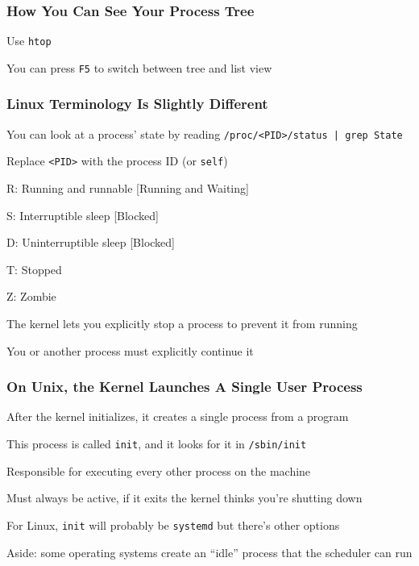   \begin{frame}
    \frametitle{How You Can See Your Process Tree}

    Use \texttt{htop}

    \vspace{2em}

    You can press \texttt{F5} to switch between tree and list view
  \end{frame}

  \begin{frame}
    \frametitle{Linux Terminology Is Slightly Different}

    You can look at a process' state by reading \texttt{/proc/<PID>/status | grep State}

    \hspace{2em} Replace \texttt{<PID>} with the process ID (or \texttt{self})

    \vspace{2em}

    R: Running and runnable [Running and Waiting]

    S: Interruptible sleep [Blocked]

    D: Uninterruptible sleep [Blocked]

    T: Stopped

    Z: Zombie

    \vspace{2em}

    The kernel lets you explicitly stop a process to prevent it from running

    \hspace{2em} You or another process must explicitly continue it
  \end{frame}

  \begin{frame}
    \frametitle{On Unix, the Kernel Launches A Single User Process}

    After the kernel initializes, it creates a single process
    from a program

    \vspace{2em}

    This process is called \texttt{init}, and it looks for it in \texttt{/sbin/init}

    \hspace{2em} Responsible for executing every other process on the machine

    \hspace{2em} Must always be active, if it exits the kernel thinks you're shutting down

    \vspace{2em}

    For Linux, \texttt{init} will probably be \texttt{systemd} but there's other options

    \vspace{2em}

    Aside: some operating systems create an ``idle'' process that the
    scheduler can run
  \end{frame}

